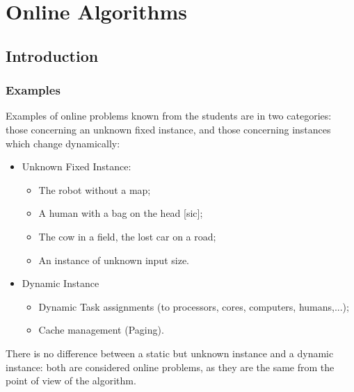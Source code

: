 
\chapter{Online Algorithms}
\label{cha:online-algorithms}


\section{Introduction}
\label{sec:introduction-online-algorithms}


\subsection{Examples}
\label{sec:examples}



Examples of online problems known from the students are in two
categories: those concerning an unknown fixed instance, and those
concerning instances which change dynamically:

\begin{itemize}
\item Unknown Fixed Instance:
  \begin{itemize}
  \item The robot without a map;
  \item A human with a bag on the head [sic];
  \item The cow in a field, the lost car on a road;
  \item An instance of unknown input size.
  \end{itemize}

\item Dynamic Instance
  \begin{itemize}
  \item Dynamic Task assignments (to processors, cores, computers,
    humans,...);
  \item Cache management (Paging).
  \end{itemize}
\end{itemize}



There is no difference between a static but unknown instance and a
dynamic instance: both are considered online problems, as they are the
same from the point of view of the algorithm.





